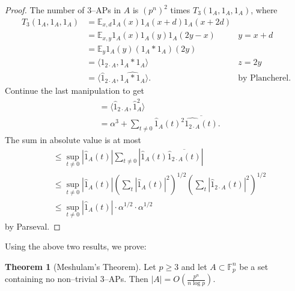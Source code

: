\documentclass{article}
\theoremstyle{definition}
\newtheorem{theorem}{Theorem}[section]
\begin{document}
\begin{proof}
    The number of 3--APs in $A$ is $(p^n)^2$ times $T_3(1_A,1_A,1_A)$, where
    \begin{align*}
        T_3(1_A,1_A,1_A) &= \mathbb{E}_{x,d}1_A(x)1_A(x+d)1_A(x+2d) \\
        &= \mathbb{E}_{x,y}1_A(x)1_A(y)1_A(2y-x) &y=x+d\\
        &= \mathbb{E}_{y}1_A(y) (1_A * 1_A)(2y) \\
        &= \langle 1_{2\cdot A}, 1_A * 1_A \rangle &z=2y\\
        &= \langle \hat{1}_{2\cdot A}, \widehat{1_A * 1_A}\rangle. &\text{by Plancherel}.
    \end{align*}
    Continue the last manipulation to get 
    \begin{align*}
        &= \langle \hat{1}_{2\cdot A}, \hat{1}_A^2 \rangle \\
        &= \alpha^3 + \sum_{t \neq 0}^{} \hat{1}_A(t)^2 \overline{\widehat{1_{2\cdot A}}(t)}.
    \end{align*}
    The sum in absolute value is at most 
    \begin{align*}
        &\le \sup_{t \neq 0}|\hat{1}_A(t)|\sum_{t\neq0}^{} |\hat{1}_A(t)\overline{\hat{1}_{2\cdot A}(t)}| \\
        &\le \sup_{t\neq 0}|\hat{1}_A(t)| \left(\sum_{t}^{} |\hat{1}_A(t)|^2\right)^{1/2}\left(\sum_{t}^{} |\hat{1}_{2\cdot A}(t)|^2\right)^{1/2}\\
        &\le \sup_{t \neq 0}|\hat{1}_A(t)|\cdot \alpha^{1/2} \cdot \alpha^{1/2} 
    \end{align*}
    by Parseval.
\end{proof}
Using the above two results, we prove:
\begin{theorem}[Meshulam's Theorem]
    Let $p\ge 3$ and let $A \subset \mathbb{F}_p^n$ be a set containing no non--trivial 3--APs. Then $|A| = O\left(\frac{p^n}{n \log p}\right)$. 
\end{theorem}
\end{document}
